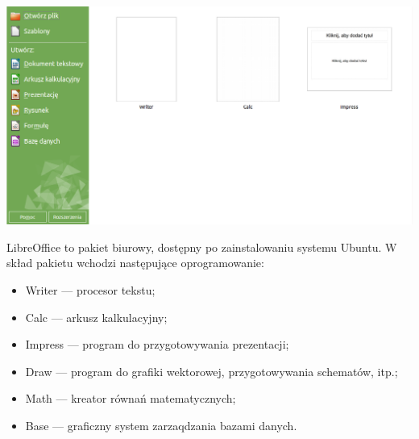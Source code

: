 \begin{center}
	\includegraphics[width=\linewidth]{images/programy_libreoffice1.png}
\end{center}

LibreOffice to pakiet biurowy, dostępny po zainstalowaniu systemu Ubuntu. W skład pakietu wchodzi następujące oprogramowanie:
\begin{itemize}
\item \textcolor{ubuntu_orange}{Writer} --- procesor tekstu;
\item \textcolor{ubuntu_orange}{Calc} --- arkusz kalkulacyjny;
\item \textcolor{ubuntu_orange}{Impress} --- program do przygotowywania prezentacji;
\item \textcolor{ubuntu_orange}{Draw} --- program do grafiki wektorowej, przygotowywania schematów, itp.;
\item \textcolor{ubuntu_orange}{Math} --- kreator równań matematycznych;
\item \textcolor{ubuntu_orange}{Base} --- graficzny system zarzaqdzania bazami danych.
\end{itemize}
